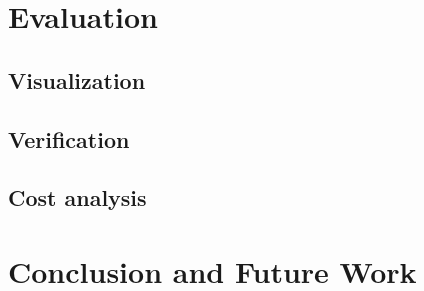 \documentclass[sigconf]{acmart}
\begin{document}
	\section{Evaluation}
	
	
	\subsection{Visualization} %
	\subsection{Verification} %
	\subsection{Cost analysis} %
	
	\section{Conclusion and Future Work} %
\end{document}
